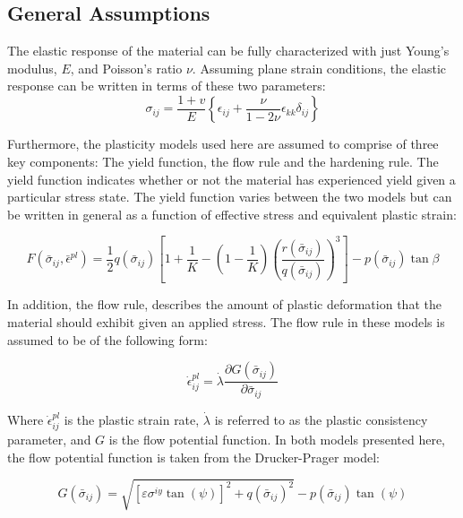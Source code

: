 \subsection{General Assumptions}
The elastic response of the material can be fully characterized with just Young's modulus, $E$, and Poisson's ratio $\nu$. Assuming plane strain conditions, the elastic response can be written in terms of these two parameters:
\begin{equation}
\sigma_{ij}=\frac{1+v}{E}\left\{\epsilon_{ij}+\frac{\nu}{1-2\nu}\epsilon_{kk}\delta_{ij}\right\}
\label{eqn:const8a}
\end{equation}

Furthermore, the plasticity models used here are assumed to comprise of three key components: The yield function, the flow rule and the hardening rule. The yield function indicates whether or not the material has experienced yield given a particular stress state. The yield function varies between the two models but can be written in general as a function of effective stress and equivalent plastic strain:

\begin{equation}
F\left(\bar{\sigma}_{ij}, \bar{\epsilon}^{pl}\right)=\frac{1}{2}q\left(\bar{\sigma}_{ij}\right)\left [ 1+\frac{1}{K}-\left ( 1-\frac{1}{K} \right )\left ( \frac{r\left(\bar{\sigma}_{ij}\right)}{q\left(\bar{\sigma}_{ij}\right)} \right )^3 \right ]-p\left(\bar{\sigma}_{ij}\right)\tan\beta
\label{eqn:const8c}
\end{equation}

In addition, the flow rule, describes the amount of plastic deformation that the material should exhibit given an applied stress. The flow rule in these models is assumed to be of the following form:

\begin{equation}
\dot{\epsilon}^{pl}_{ij}=\dot{\lambda} \frac{\partial G\left(\bar{\sigma}_{ij}\right)}{\partial \bar{\sigma}_{ij}}
\label{eqn:const8b}
\end{equation}

Where $\dot{\epsilon}^{pl}_{ij}$ is the plastic strain rate, $\dot{\lambda}$ is referred to as the plastic consistency parameter, and $G$ is the flow potential function. In both models presented here, the flow potential function is taken from the Drucker-Prager model:

\begin{equation}
G\left(\bar{\sigma}_{ij}\right)=\sqrt{\left[\varepsilon\sigma^{iy}\tan\left(\psi\right)\right]^{2}+q\left(\bar{\sigma}_{ij}\right)^{2}}-p\left(\bar{\sigma}_{ij}\right)\tan\left(\psi\right)\label{eqn:const11}
\end{equation}

